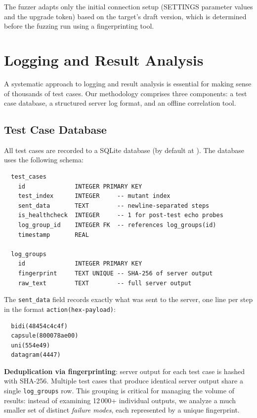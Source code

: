 The fuzzer adapts only the initial connection setup (SETTINGS parameter values and the upgrade token) based on the target's draft version, which is determined before the fuzzing run using a fingerprinting tool.

\section{Logging and Result Analysis}
\label{sec:logging}

A systematic approach to logging and result analysis is essential for making sense of thousands of test cases. Our methodology comprises three components: a test case database, a structured server log format, and an offline correlation tool.

\subsection{Test Case Database}

All test cases are recorded to a SQLite database (by default at ). The database uses the following schema:

\begin{verbatim}
  test_cases
    id              INTEGER PRIMARY KEY
    test_index      INTEGER     -- mutant index
    sent_data       TEXT        -- newline-separated steps
    is_healthcheck  INTEGER     -- 1 for post-test echo probes
    log_group_id    INTEGER FK  -- references log_groups(id)
    timestamp       REAL

  log_groups
    id              INTEGER PRIMARY KEY
    fingerprint     TEXT UNIQUE -- SHA-256 of server output
    raw_text        TEXT        -- full server output
\end{verbatim}

The \texttt{sent\_data} field records exactly what was sent to the server, one line per step in the format \texttt{action(hex-payload)}:

\begin{verbatim}
  bidi(48454c4c4f)
  capsule(800078ae00)
  uni(554e49)
  datagram(4447)
\end{verbatim}

\textbf{Deduplication via fingerprinting}: server output for each test case is hashed with SHA-256. Multiple test cases that produce identical server output share a single \texttt{log\_groups} row. This grouping is critical for managing the volume of results: instead of examining 12\,000+ individual outputs, we analyze a much smaller set of distinct \emph{failure modes}, each represented by a unique fingerprint.

